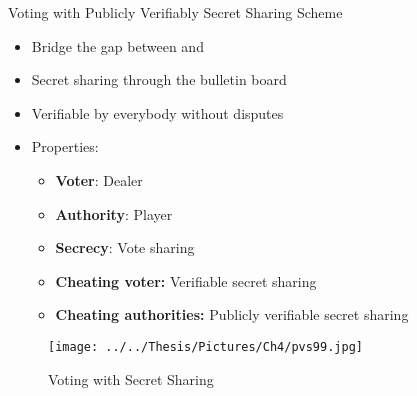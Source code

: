 \documentclass{beamer}
\begin{document}
\begin{frame}[allowframebreaks]{Voting with Publicly Verifiably Secret Sharing Scheme}
\begin{itemize}
\item Bridge the gap between \cite {CFSY96} and \cite{CGS97}
\item Secret sharing through the bulletin board
\item Verifiable by everybody without disputes
\item Properties:
\begin{itemize}
\item \textbf{Voter}: Dealer
\item \textbf{Authority}: Player
\item \textbf{Secrecy}: Vote sharing
\item\textbf{ Cheating voter:} Verifiable secret sharing
\item \textbf{Cheating authorities:} Publicly verifiable secret sharing
\end{itemize}
\end{itemize}

\framebreak
 
\begin{figure}[htbp]
\centering
\texttt{[image: ../../Thesis/Pictures/Ch4/pvs99.jpg]} 
\caption{Voting with Secret Sharing \cite{PVSS99}}
\label{fig:nsprod}
\end{figure}

\framebreak


\end{frame}
\end{document}
